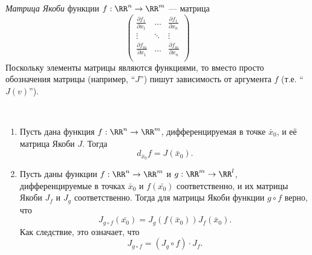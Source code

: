\documentclass[12pt,a4paper]{article}
\begin{document}
    \begin{definition}
        \emph{Матрица Якоби} функции $f: \RR^n \to \RR^m$ --- матрица
        \[
            \begin{pmatrix}
                \frac{\partial f_1}{\partial x_1}& \dots& \frac{\partial f_1}{\partial x_n}\\
                \vdots& \ddots& \vdots\\
                \frac{\partial f_m}{\partial x_1}& \dots& \frac{\partial f_m}{\partial x_n}\\
            \end{pmatrix}
        \]
        Поскольку элементы матрицы являются функциями, то вместо просто обозначения матрицы (например, ``$J$'') пишут зависимость от аргумента $f$ (т.е. ``$J(v)$'').
    \end{definition}

    \begin{lemma}\ 
        \begin{enumerate}
            \item Пусть дана функция $f: \RR^n \to \RR^m$, дифференцируемая в точке $\bar{x}_0$, и её матрица Якоби $J$. Тогда
                \[d_{\bar{x}_0}f = J(\bar{x}_0).\]
            \item Пусть даны функции $f: \RR^n \to \RR^m$ и $g: \RR^m \to \RR^l$, дифференцируемые в точках $\bar{x}_0$ и $f(\bar{x_0})$ соответственно, и их матрицы Якоби $J_f$ и $J_g$ соответственно. Тогда для матрицы Якоби функции $g \circ f$ верно, что
                \[J_{g \circ f}(\bar{x_0}) = J_g(f(\bar{x}_0)) J_f(\bar{x}_0).\]
                Как следствие, это означает, что
                \[J_{g \circ f} = (J_g \circ f) \cdot J_f.\]
        \end{enumerate}
    \end{lemma}
\end{document}

